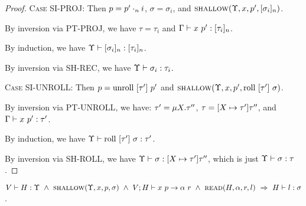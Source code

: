 \documentclass{article}
\begin{document}
\begin{proof}
  \textsc{Case SI-PROJ}:
    Then $p = {p'}\cdot_{n} {i}$, $\sigma = \sigma_i$,
    and $\textsc{shallow}({\Upsilon},{x},{p'},{[ {\sigma_i} ]_{n}})$.

    By inversion via \textsc{PT-PROJ}, we have $\tau = \tau_i$ and 
    ${{\Gamma}} \vdash {{x}\ {p'}} : {{[ {\tau_i} ]_{n}}}$.

    By induction, we have ${\Upsilon} \vdash {[ {\sigma_i} ]_{n}} : {[ {\tau_i} ]_{n}}$.

    By inversion via \textsc{SH-REC}, we have ${\Upsilon} \vdash {\sigma_i} : {\tau_i}$.

  \textsc{Case SI-UNROLL}:
    Then $p = \textrm{unroll}\ [{\tau'}]\ {p'}$ and $\textsc{shallow}({\Upsilon},{x},{p'},{\textrm{roll}\ [{\tau'}]\ {\sigma}})$.

    By inversion via \textsc{PT-UNROLL}, we have: 
    $\tau' = \mu {X}.{\tau''}$,
    $\tau = [{X} \mapsto {\tau'}]{\tau''}$, and
    ${{\Gamma}} \vdash {{x}\ {p'}} : {{\tau'}}$.

    By induction, we have ${\Upsilon} \vdash {\textrm{roll}\ [{\tau'}]\ {\sigma}} : {\tau'}$.

    By inversion via \textsc{SH-ROLL}, we have
    ${\Upsilon} \vdash {\sigma} : {[{X} \mapsto {\tau'}]{\tau''}}$, 
    which is just ${\Upsilon} \vdash {\sigma} : {\tau}$.

\end{proof}

\begin{lem}
  $\Type{V}{H}{\Upsilon}\ \land\ \Shallow{\Upsilon}{x}{p}{\sigma}\ \land\
   \PEval{V}{H}{x}{p}{\alpha}{r}\ \land\ \Read{H}{\alpha}{r}{l}\ \Rightarrow\
   \Type{H}{l}{\sigma}$.
\end{lem}
\end{document}
